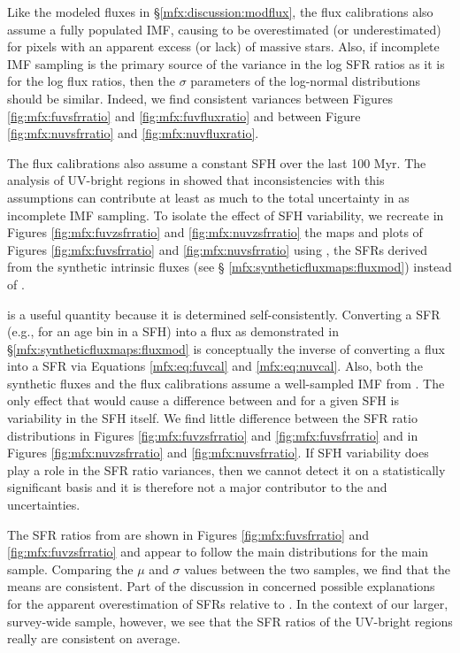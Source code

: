 Like the modeled fluxes in \S \ref{mfx:discussion:modflux}, the flux
calibrations also assume a fully populated IMF, causing \sfrx{} to be
overestimated (or underestimated) for pixels with an apparent excess (or lack)
of massive stars. Also, if incomplete IMF sampling is the primary source of the
variance in the log SFR ratios as it is for the log flux ratios, then the
$\sigma$ parameters of the log-normal distributions should be similar. Indeed,
we find consistent variances between Figures \ref{fig:mfx:fuvsfrratio} and
\ref{fig:mfx:fuvfluxratio} and between Figure \ref{fig:mfx:nuvsfrratio} and
\ref{fig:mfx:nuvfluxratio}.

The flux calibrations also assume a constant SFH over the last 100 Myr. The
analysis of UV-bright regions in \citet{Simones:2014} showed that
inconsistencies with this assumptions can contribute at least as much to the
total uncertainty in \sfrfuv{} as incomplete IMF sampling. To isolate the
effect of SFH variability, we recreate in Figures \ref{fig:mfx:fuvzsfrratio}
and \ref{fig:mfx:nuvzsfrratio} the maps and plots of Figures
\ref{fig:mfx:fuvsfrratio} and \ref{fig:mfx:nuvsfrratio} using \sfrxz{}, the
SFRs derived from the synthetic intrinsic fluxes (see \S
\ref{mfx:syntheticfluxmaps:fluxmod}) instead of \sfrx{}.

\sfrxz{} is a useful quantity because it is determined self-consistently.
Converting a SFR (e.g., for an age bin in a SFH) into a flux as demonstrated in
\S \ref{mfx:syntheticfluxmaps:fluxmod} is conceptually the inverse of
converting a flux into a SFR via Equations \ref{mfx:eq:fuvcal} and
\ref{mfx:eq:nuvcal}. Also, both the synthetic fluxes and the flux calibrations
assume a well-sampled IMF from \citet{Kroupa:2001}. The only effect that would
cause a difference between \sfroneh{} and \sfrxz{} for a given SFH is
variability in the SFH itself. We find little difference between the SFR ratio
distributions in Figures \ref{fig:mfx:fuvzsfrratio} and
\ref{fig:mfx:fuvsfrratio} and in Figures \ref{fig:mfx:nuvzsfrratio} and
\ref{fig:mfx:nuvsfrratio}. If SFH variability does play a role in the SFR ratio
variances, then we cannot detect it on a statistically significant basis and it
is therefore not a major contributor to the \sfrx{} and \sfrxz{} uncertainties.

The \fuv{} SFR ratios from \citet{Simones:2014} are shown in Figures
\ref{fig:mfx:fuvsfrratio} and \ref{fig:mfx:fuvzsfrratio} and appear to follow
the main distributions for the main sample. Comparing the $\mu$ and $\sigma$
values between the two samples, we find that the means are consistent. Part of
the discussion in \citet{Simones:2014} concerned possible explanations for the
apparent overestimation of SFRs relative to \sfroneh{}. In the context of our
larger, survey-wide sample, however, we see that the SFR ratios of the
UV-bright regions really are consistent on average.

